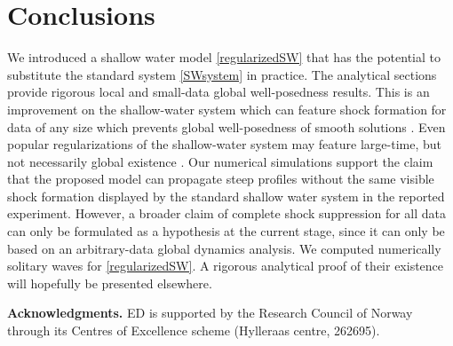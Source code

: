 \documentclass[reqno,12pt,a4paper]{article}
\theoremstyle{plain}
\begin{document}
\section{Conclusions}
\setcounter{equation}{0}
%
\noindent
%
%
We introduced a shallow water model \eqref{regularizedSW} that has the potential
to substitute the standard system \eqref{SWsystem} in practice.
The analytical sections provide rigorous local and small-data global well-posedness results.
This is an improvement on the shallow-water system which can feature shock formation for
data of any size which prevents global well-posedness of smooth solutions \cite{Evans}. Even popular regularizations
of the shallow-water system may feature large-time, but not necessarily global existence \cite{Israwi2011}.
Our numerical simulations support
the claim that the proposed model can propagate steep profiles without the same visible shock
formation displayed by the standard shallow water system in the reported experiment.
However,
a broader claim of complete shock suppression for all data
can only be formulated as a hypothesis at the current stage,
since it can only be based on an arbitrary-data global dynamics analysis.
We computed numerically solitary waves for \eqref{regularizedSW}.
A rigorous analytical proof of their existence will hopefully be presented elsewhere.


%
%
%
\vskip 0.05in
\noindent
{\bf Acknowledgments.}
{
    ED is supported by the Research Council of Norway through
    its Centres of Excellence scheme (Hylleraas centre, 262695).
}
%
%
\end{document}

